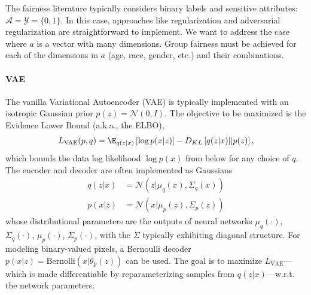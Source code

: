 The fairness literature typically considers binary labels and sensitive attributes: $\mathcal{A} = \mathcal{Y} = \{0, 1\}$.
In this case, approaches like regularization \citep{zemel2013learning} and adversarial regularization \citep{edwards2015censoring, madras2018learning} are straightforward to implement. 
We want to address the case where $a$ is a vector with many dimensions.
Group fairness must be achieved for each of the dimensions in $a$ (age, race, gender, etc.) and their combinations.

\paragraph{VAE}
The vanilla Variational Autoencoder (VAE) \citep{kingma2013auto} is typically implemented with an isotropic Gaussian prior $p(z) = \mathcal{N}(0, I)$.
The objective to be maximized is the Evidence Lower Bound (a.k.a., the ELBO), 
\begin{align}
    L_{\text{VAE}}(p,q) = \E_{q(z|x)} \left[ \log p(x|z) \right] - D_{KL} \left[ q(z|x) || p(z)  \right], \nonumber
\end{align}
which bounds the data log likelihood $\log p(x)$ from below for any choice of $q$.
The encoder and decoder are often implemented as Gaussians 
\begin{align}
    q(z|x) &= \mathcal{N}(z|\mu_q(x),  \Sigma_q(x)) \nonumber \\
    p(x|z) &= \mathcal{N}(x|\mu_p(z), \Sigma_p(z)) \nonumber
\end{align}
whose distributional parameters are the outputs of neural networks $\mu_q(\cdot)$, $\Sigma_q(\cdot)$, $\mu_p(\cdot)$, $\Sigma_p(\cdot)$, with the $\Sigma$ typically exhibiting diagonal structure.
For modeling binary-valued pixels, a Bernoulli decoder $p(x|z)=\text{Bernolli}(x|\theta_p(z))$ can be used.
The goal is to maximize $L_{\text{VAE}}$---which is made differentiable by reparameterizing samples from $q(z|x)$---w.r.t. the network parameters.

